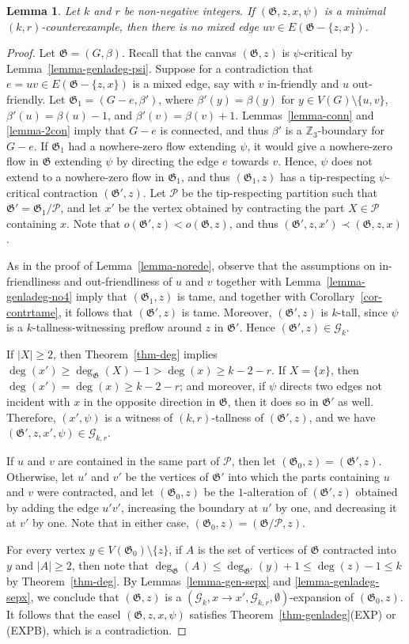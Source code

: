 \documentclass{article}
\newcommand{\Z}{\mathbb{Z}_3}
\newcommand{\PP}{\mathcal{P}}
\newcommand{\GG}{\mathcal{G}}
\newcommand\g{\mathfrak{G}}
\newtheorem{lemma}[theorem]{Lemma}
\begin{document}
\begin{lemma}\label{lemma-genladeg-norede2}
Let $k$ and $r$ be non-negative integers.  If $(\g,z,x,\psi)$ is a minimal $(k,r)$-counter\-exam\-ple, then there is no mixed edge $uv\in E(\g-\{z,x\})$.
\end{lemma}
\begin{proof}
Let $\g=(G,\beta)$.  Recall that the canvas $(\g,z)$ is $\psi$-critical by Lemma~\ref{lemma-genladeg-psi}.
Suppose for a contradiction that $e=uv\in E(\g-\{z,x\})$ is a mixed edge, say with $v$ in-friendly and
$u$ out-friendly.  Let $\g_1=(G-e,\beta')$, where $\beta'(y)=\beta(y)$ for $y\in V(G)\setminus\{u,v\}$, $\beta'(u)=\beta(u)-1$, and $\beta'(v)=\beta(v)+1$.
Lemmas~\ref{lemma-conn} and \ref{lemma-2con} imply that $G-e$ is connected, and thus $\beta'$ is a $\Z$-boundary for $G-e$.
If $\g_1$ had a nowhere-zero flow extending $\psi$, it would give a nowhere-zero flow in $\g$ extending $\psi$
by directing the edge $e$ towards $v$.  Hence, $\psi$ does not extend to a nowhere-zero flow in $\g_1$, and thus $(\g_1,z)$ has a tip-respecting
$\psi$-critical contraction $(\g',z)$. Let $\PP$ be the tip-respecting partition such that $\g'=\g_1/\PP$, and let $x'$ be the vertex obtained by contracting the part $X\in \PP$ containing $x$.
Note that $o(\g',z)<o(\g,z)$, and thus $(\g',z,x')\prec (\g,z,x)$.

As in the proof of Lemma~\ref{lemma-norede}, observe that the assumptions on in-friendliness and out-friendliness of $u$ and $v$ together with
Lemma~\ref{lemma-genladeg-no4} imply that $(\g_1,z)$ is tame, and together with Corollary~\ref{cor-contrtame},
it follows that $(\g',z)$ is tame.  Moreover, $(\g',z)$ is $k$-tall, since $\psi$ is a $k$-tallness-witnessing preflow around $z$ in $\g'$.
Hence $(\g',z)\in\GG_k$.

If $|X|\ge 2$, then Theorem~\ref{thm-deg} implies $\deg(x')\ge \deg_{\g}(X)-1 >\deg(x) \ge k-2-r$.  If $X=\{x\}$,
then $\deg(x')=\deg(x)\ge k-2-r$; and moreover, if $\psi$ directs two edges not incident with $x$ in the opposite direction in $\g$,
then it does so in $\g'$ as well.  Therefore, $(x',\psi)$ is a witness of $(k,r)$-tallness of $(\g',z)$, and we have $(\g',z,x',\psi)\in\GG_{k,r}$.

If $u$ and $v$ are contained in the same part of $\PP$, then let $(\g_0,z)=(\g',z)$.  Otherwise, let $u'$ and $v'$ be the vertices of $\g'$
into which the parts containing $u$ and $v$ were contracted, and let $(\g_0,z)$ be the $1$-alteration of $(\g',z)$ obtained by adding the edge $u'v'$,
increasing the boundary at $u'$ by one, and decreasing it at $v'$ by one.  Note that in either case, $(\g_0,z)=(\g/\PP,z)$.

For every vertex $y\in V(\g_0)\setminus\{z\}$, if $A$ is the set of vertices of $\g$ contracted into $y$ and $|A|\ge 2$,
then note that $\deg_{\g}(A)\le \deg_{\g'}(y)+1\le \deg(z)-1\le k$ by Theorem~\ref{thm-deg}.
By Lemmas~\ref{lemma-gen-sepx} and \ref{lemma-genladeg-sepx}, we conclude that $(\g,z)$ is a $(\GG_k,x\to x',\GG_{k,r},\emptyset)$-expansion of $(\g_0,z)$.
It follows that the easel $(\g,z,x,\psi)$ satisfies Theorem~\ref{thm-genladeg}(EXP) or (EXPB),
which is a contradiction.
\end{proof}
\end{document}
